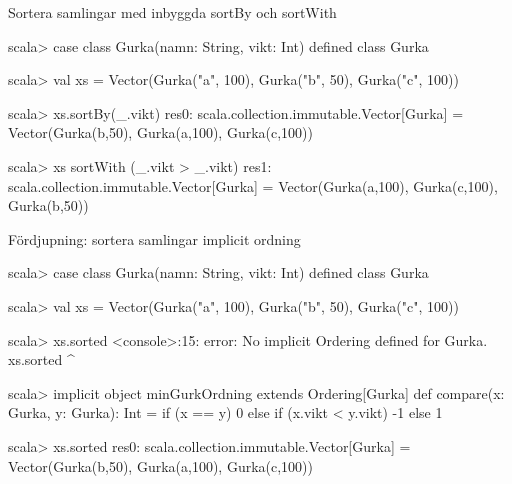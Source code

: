 \begin{Slide}{Sortera samlingar med inbyggda sortBy och sortWith}
\begin{REPL}
scala> case class Gurka(namn: String, vikt: Int)
defined class Gurka

scala> val xs = Vector(Gurka("a", 100), Gurka("b", 50), Gurka("c", 100))

scala> xs.sortBy(_.vikt)
res0: scala.collection.immutable.Vector[Gurka] = 
        Vector(Gurka(b,50), Gurka(a,100), Gurka(c,100))

scala> xs sortWith (_.vikt > _.vikt)
res1: scala.collection.immutable.Vector[Gurka] = 
        Vector(Gurka(a,100), Gurka(c,100), Gurka(b,50))

\end{REPL}
\end{Slide}

        
\begin{Slide}{Fördjupning: sortera samlingar implicit ordning}
\begin{REPL}
scala> case class Gurka(namn: String, vikt: Int)
defined class Gurka

scala> val xs = Vector(Gurka("a", 100), Gurka("b", 50), Gurka("c", 100))

scala> xs.sorted
<console>:15: error: No implicit Ordering defined for Gurka.
       xs.sorted
          ^

scala> implicit object minGurkOrdning extends Ordering[Gurka] {
         def compare(x: Gurka, y: Gurka): Int = 
           if (x == y) 0 
           else if (x.vikt < y.vikt) -1
           else 1
       }

scala> xs.sorted
res0: scala.collection.immutable.Vector[Gurka] = 
        Vector(Gurka(b,50), Gurka(a,100), Gurka(c,100))
\end{REPL}
\end{Slide}


